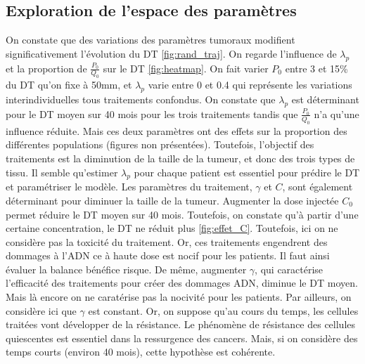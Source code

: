 \documentclass[12pt,a4paper]{article}
\begin{document}
\subsection{Exploration de l'espace des paramètres}
On constate que des variations des paramètres tumoraux modifient significativement l'évolution du DT \ref{fig:rand_traj}.  On regarde l'influence de $\lambda_{p}$ et  la proportion de $\frac{P_{0}}{Q_{0}}$
sur le DT \ref{fig:heatmap}. On fait varier $P_{0}$ entre 3 et 15\% du DT qu'on fixe à 50mm, et $\lambda_{p}$ varie entre 0 et 0.4 qui représente les variations interindividuelles tous traitements confondus. On constate que $\lambda_{p}$ est déterminant pour le DT moyen sur 40 mois pour les trois traitements tandis que $\frac{P_{0}}{Q_{0}}$ n'a qu'une influence réduite. Mais ces deux paramètres ont des effets sur la proportion des différentes populations (figures non présentées). Toutefois, l'objectif des traitements est la diminution de la taille de la tumeur, et donc des trois types de tissu. Il semble qu'estimer $\lambda_{p}$ pour chaque patient est essentiel pour prédire le DT et paramétriser le modèle. Les paramètres du traitement,  $\gamma$ et $C$, sont également déterminant pour diminuer la taille de la tumeur. Augmenter la dose injectée $C_{0}$ permet réduire le DT moyen sur 40 mois. Toutefois, on constate qu'à partir d'une certaine concentration, le DT ne réduit plus \ref{fig:effet_C}. Toutefois, ici on ne considère pas la toxicité du traitement.  Or, ces traitements engendrent des dommages à l'ADN ce à haute dose est nocif pour les patients. Il faut ainsi évaluer la balance bénéfice risque. De même, augmenter $\gamma$, qui caractérise l'efficacité des traitements pour créer des dommages ADN, diminue le DT moyen. Mais là encore on ne caratérise pas la nocivité pour les patients. Par ailleurs, on considère ici que $\gamma$ est constant. Or, on suppose qu'au cours du temps, les cellules traitées vont développer de la résistance. Le phénomène de résistance des cellules quiescentes est essentiel dans la ressurgence des cancers. Mais, si on considère des temps courts (environ 40 mois), cette hypothèse est cohérente. 
\end{document}
